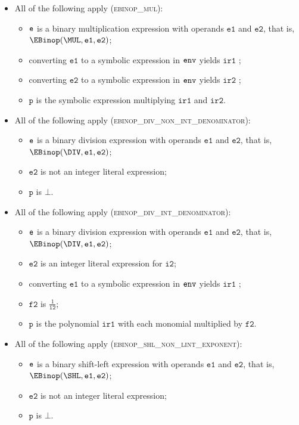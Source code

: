 \documentclass{book}
\newcommand\vitwo[0]{\texttt{i2}}
\newcommand\vftwo[0]{\texttt{f2}}
\newcommand\vp[0]{\texttt{p}}
\newcommand\veone[0]{\texttt{e1}}
\newcommand\vetwo[0]{\texttt{e2}}
\newcommand\irone[0]{\texttt{ir1}}
\newcommand\irtwo[0]{\texttt{ir2}}
\begin{document}
\begin{itemize}
  \item All of the following apply (\textsc{ebinop\_mul}):
  \begin{itemize}
    \item $\texttt{e}$ is a binary multiplication expression with operands $\veone$ and $\vetwo$, that is, \\ $\EBinop(\MUL, \veone, \vetwo)$;
    \item converting $\veone$ to a symbolic expression in $\texttt{env}$ yields $\irone$ \ProseOrTypeErrorOrBot;
    \item converting $\vetwo$ to a symbolic expression in $\texttt{env}$ yields $\irtwo$ \ProseOrTypeErrorOrBot;
    \item $\vp$ is the symbolic expression multiplying $\irone$ and $\irtwo$.
  \end{itemize}

  \item All of the following apply (\textsc{ebinop\_div\_non\_int\_denominator}):
  \begin{itemize}
    \item $\texttt{e}$ is a binary division expression with operands $\veone$ and $\vetwo$, that is, \\ $\EBinop(\DIV, \veone, \vetwo)$;
    \item $\vetwo$ is not an integer literal expression;
    \item $\vp$ is $\bot$.
  \end{itemize}

  \item All of the following apply (\textsc{ebinop\_div\_int\_denominator}):
  \begin{itemize}
    \item $\texttt{e}$ is a binary division expression with operands $\veone$ and $\vetwo$, that is, \\ $\EBinop(\DIV, \veone, \vetwo)$;
    \item $\vetwo$ is an integer literal expression for $\vitwo$;
    \item converting $\veone$ to a symbolic expression in $\texttt{env}$ yields $\irone$ \ProseOrTypeErrorOrBot;
    \item $\vftwo$ is $\frac{1}{\vitwo}$;
    \item $\vp$ is the polynomial $\irone$ with each monomial multiplied by $\vftwo$.
  \end{itemize}

  \item All of the following apply (\textsc{ebinop\_shl\_non\_lint\_exponent}):
  \begin{itemize}
    \item $\texttt{e}$ is a binary shift-left expression with operands $\veone$ and $\vetwo$, that is, \\ $\EBinop(\SHL, \veone, \vetwo)$;
    \item $\vetwo$ is not an integer literal expression;
    \item $\vp$ is $\bot$.
  \end{itemize}


\end{itemize}
\end{document}
